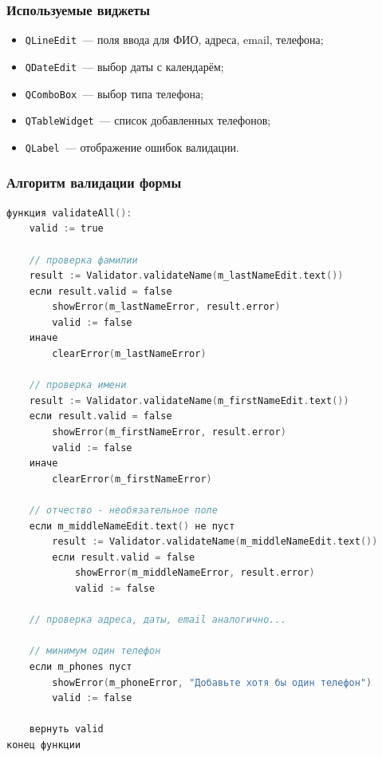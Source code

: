 \subsubsection*{Используемые виджеты}

\begin{itemize}
    \item \texttt{QLineEdit}~--- поля ввода для ФИО, адреса, email, телефона;
    \item \texttt{QDateEdit}~--- выбор даты с календарём;
    \item \texttt{QComboBox}~--- выбор типа телефона;
    \item \texttt{QTableWidget}~--- список добавленных телефонов;
    \item \texttt{QLabel}~--- отображение ошибок валидации.
\end{itemize}

\subsubsection*{Алгоритм валидации формы}

\begin{lstlisting}[language=C, caption=Функция validateAll]
функция validateAll():
    valid := true
    
    // проверка фамилии
    result := Validator.validateName(m_lastNameEdit.text())
    если result.valid = false
        showError(m_lastNameError, result.error)
        valid := false
    иначе
        clearError(m_lastNameError)
    
    // проверка имени
    result := Validator.validateName(m_firstNameEdit.text())
    если result.valid = false
        showError(m_firstNameError, result.error)
        valid := false
    иначе
        clearError(m_firstNameError)
    
    // отчество - необязательное поле
    если m_middleNameEdit.text() не пуст
        result := Validator.validateName(m_middleNameEdit.text())
        если result.valid = false
            showError(m_middleNameError, result.error)
            valid := false
    
    // проверка адреса, даты, email аналогично...
    
    // минимум один телефон
    если m_phones пуст
        showError(m_phoneError, "Добавьте хотя бы один телефон")
        valid := false
    
    вернуть valid
конец функции
\end{lstlisting}

